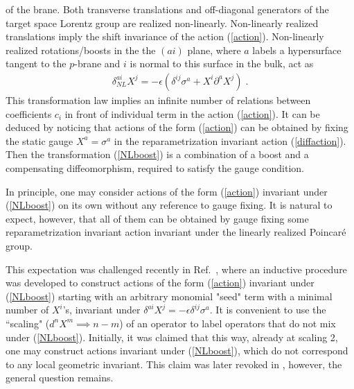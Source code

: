 \documentclass[%
 reprint,
 amsmath,amssymb,
 aps,
]{revtex4-1}
\begin{document}
of the brane. Both transverse translations and off-diagonal generators of the target space
Lorentz group are realized non-linearly. Non-linearly realized translations imply the shift invariance of the action (\ref{action}).
 Non-linearly realized rotations/boosts in the
the $(ai)$ plane, where $a$ labels a hypersurface tangent to the $p$-brane and $i$ is normal to
this surface in the bulk, act as
\begin{eqnarray}
\label{NLboost}
    \delta^{a i}_{NL} X^j =- \epsilon (\delta^{ij}
    \sigma^a + X^i \partial^a X^{j}) \; .
\end{eqnarray}
This transformation law implies an infinite number of relations between coefficients $c_i$ in front of individual term in the action (\ref{action}).
It can be deduced by  noticing that actions of the form (\ref{action}) can be obtained by fixing the static gauge $X^a=\sigma^a$
in the reparametrization invariant action (\ref{diffaction}). Then the transformation (\ref{NLboost}) is a combination of a boost and a compensating
diffeomorphism, required to satisfy the gauge condition.

In principle, one may consider actions of the form (\ref{action}) invariant under (\ref{NLboost}) on its own  without any reference to  gauge fixing.
It is natural to expect, however, that all of them can be obtained by gauge fixing some reparametrization invariant action
invariant under the linearly realized Poincar\'e group.

This expectation was challenged recently in Ref.~\cite{Gliozzi:2012cx}, where an inductive procedure was developed
to construct actions of the form (\ref{action}) invariant under (\ref{NLboost}) starting with an arbitrary monomial "seed" term with a minimal number of $X^i$'s, invariant under
$\delta^{ai}X^j=-\epsilon \delta^{ij}  \sigma^a $. It is convenient to use the ``scaling" ($d^n X^m \implies n-m$)
of an operator to label operators that do not mix under (\ref{NLboost}).
Initially, it was claimed that this way, already at scaling 2, one may construct actions invariant under   (\ref{NLboost}), which do not correspond
to any local geometric invariant. This claim was later revoked in \cite{Meineri:2013ew}, however, the general question remains.
\end{document}
